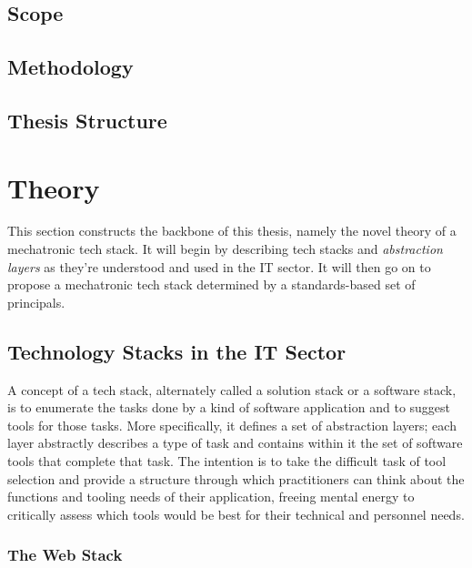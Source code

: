 \documentclass[english,12pt,a4paper,pdftex,eng,utf8]{aaltothesis}
\begin{document}
\subsection{Scope}

\lipsum[1-3]

\subsection{Methodology}

\lipsum[1-3]

\subsection{Thesis Structure}

\lipsum[1]

\clearpage


\section{Theory}

This section constructs the backbone of this thesis, namely the novel theory of a mechatronic tech stack.  It will begin by describing tech stacks and {\it abstraction layers\/} as they're understood and used in the IT sector.  It will then go on to propose a mechatronic tech stack determined by a standards-based set of principals.

\subsection{Technology Stacks in the IT Sector}

A concept of a tech stack, alternately called a solution stack or a software stack, is to enumerate the tasks done by a kind of software application and to suggest tools for those tasks.  More specifically, it defines a set of abstraction layers; each layer abstractly describes a type of task and contains within it the set of software tools that complete that task.  The intention is to take the difficult task of tool selection and provide a structure through which practitioners can think about the functions and tooling needs of their application, freeing mental energy to critically assess which tools would be best for their technical and personnel needs.

\subsubsection{The Web Stack}
\end{document}
